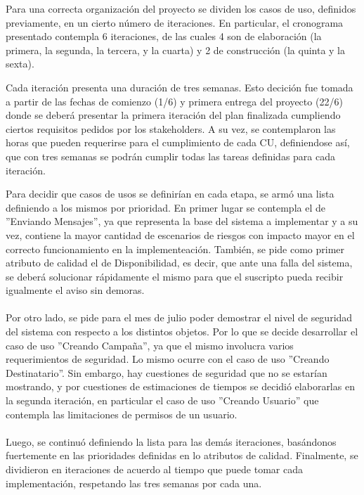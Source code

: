 \documentclass[a4paper, 11pt]{article}
\begin{document}
Para una correcta organización del proyecto se dividen los casos de uso, definidos previamente, en un cierto número de iteraciones. En particular, el cronograma presentado contempla 6 iteraciones, de las cuales 4 son de elaboración (la primera, la segunda, la tercera, y la cuarta) y 2 de construcción (la quinta y la sexta). 

Cada iteración presenta una duración de tres semanas. Esto decición fue tomada a partir de las fechas de comienzo (1/6) y primera entrega del proyecto (22/6) donde se deberá presentar la primera iteración del plan finalizada cumpliendo ciertos requisitos pedidos por los stakeholders. A su vez, se contemplaron las horas que pueden requerirse para el cumplimiento de cada CU, definiendose así, que con tres semanas se podrán cumplir todas las tareas definidas para cada iteración.

Para decidir que casos de usos se definirían en cada etapa, se armó una lista definiendo a los mismos por prioridad. En primer lugar se contempla el de ''Enviando Mensajes'', ya que representa la base del sistema a implementar y a su vez, contiene la mayor cantidad de escenarios de riesgos con impacto mayor en el correcto funcionamiento en la implementeación. También, se pide como primer atributo de calidad el de Disponibilidad, es decir, que ante una falla del sistema, se deberá solucionar rápidamente el mismo para que el suscripto pueda recibir igualmente el aviso sin demoras.\\  
\\
Por otro lado, se pide para el mes de julio poder demostrar el nivel de seguridad del sistema con respecto a los distintos objetos. Por lo que se decide desarrollar el caso de uso ''Creando Campaña'', ya que el mismo involucra varios requerimientos de seguridad. Lo mismo ocurre con el caso de uso ''Creando Destinatario''. Sin embargo, hay cuestiones de seguridad que no se estar\'ian mostrando, y por cuestiones de estimaciones de tiempos se decidi\'o elaborarlas en la segunda iteraci\'on, en particular el caso de uso ''Creando Usuario'' que contempla las limitaciones de permisos de un usuario.\\
\\
Luego, se continuó definiendo la lista para las demás iteraciones, basándonos fuertemente en las prioridades definidas en lo atributos de calidad. Finalmente, se dividieron en iteraciones de acuerdo al tiempo que puede tomar cada implementación, respetando las tres semanas por cada una. \\ 
\end{document}
